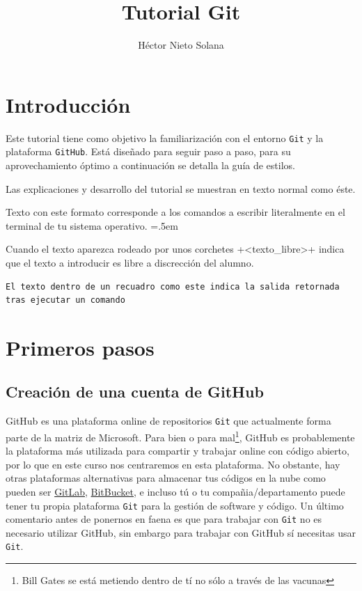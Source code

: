 \documentclass[a5paper, oneside,10pt]{article}
\title{Tutorial Git}
\author{Héctor Nieto Solana}
\newenvironment{cverbatim}
 {\SaveVerbatim{cverb}}
 {\endSaveVerbatim
  \flushleft\fboxrule=0pt\fboxsep=.5em
  \colorbox{bg}{\BUseVerbatim{cverb}}%
  \endflushleft
}
\begin{document}
 \maketitle
 \tableofcontents

 \clearpage
 
 \section*{Introducción}
 
  Este tutorial tiene como objetivo la familiarización con el entorno \verb+Git+ y la plataforma \verb+GitHub+. Está diseñado para seguir paso a paso, para su aprovechamiento óptimo a continuación se detalla la guía de estilos.
 
  Las explicaciones y desarrollo del tutorial se muestran en texto normal como éste.
 
  \begin{cverbatim}
Texto con este formato corresponde a los comandos a escribir
literalmente en el terminal de tu sistema operativo. 
  \end{cverbatim}

  Cuando el texto aparezca rodeado por unos corchetes \cverb+<texto_libre>+ indica que el texto a introducir es libre a discrección del alumno.
  
  \begin{lstlisting}[style=custom, caption=Ejemplo de salida retornada por un comando]
El texto dentro de un recuadro como este indica la salida retornada tras ejecutar un comando
  \end{lstlisting} 

 \clearpage

 \section{Primeros pasos}

  \subsection{Creación de una cuenta de GitHub}\label{sec:github_login}
    GitHub es una plataforma online de repositorios \verb+Git+ que actualmente forma parte de la matriz de Microsoft. Para bien o para mal\footnote{Bill Gates se está metiendo dentro de tí no sólo a través de las vacunas}, GitHub es probablemente la plataforma más utilizada para compartir y trabajar online con código abierto, por lo que en este curso nos centraremos en esta plataforma. No obstante, hay otras plataformas alternativas para almacenar tus códigos en la nube como pueden ser \href{https://about.gitlab.com}{GitLab}, \href{https://bitbucket.org}{BitBucket}, e incluso tú o tu compañia/departamento puede tener tu propia plataforma \verb+Git+ para la gestión de software y código. Un último comentario antes de ponernos en faena es que para trabajar con \verb+Git+ no es necesario utilizar GitHub, sin embargo para trabajar con GitHub sí necesitas usar \verb+Git+. 
    
\end{document}
